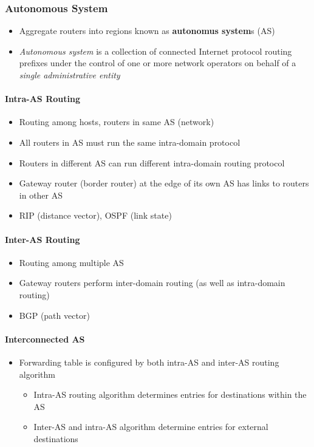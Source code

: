 \subsubsection{Autonomous System}
\begin{itemize}
	\item Aggregate routers into regions known as \textbf{autonomus system}s (AS)
	\item \textit{Autonomous system} is a collection of connected Internet protocol routing prefixes under the control of one or more network operators on behalf of a \textit{single administrative entity}
\end{itemize}

\paragraph{Intra-AS Routing}
\begin{itemize}
	\item Routing among hosts, routers in same AS (network)
	\item All routers in AS must run the same intra-domain protocol
	\item Routers in different AS can run different intra-domain routing protocol
	\item Gateway router (border router) at the edge of its own AS has links to routers in other AS
	\item RIP (distance vector), OSPF (link state)
\end{itemize}

\paragraph{Inter-AS Routing}
\begin{itemize}
	\item Routing among multiple AS
	\item Gateway routers perform inter-domain routing (as well as intra-domain routing)
	\item BGP (path vector)
\end{itemize}

\paragraph{Interconnected AS}
\begin{itemize}
	\item Forwarding table is configured by both intra-AS and inter-AS routing algorithm
	\begin{itemize}
		\item Intra-AS routing algorithm determines entries for destinations within the AS
		\item Inter-AS and intra-AS algorithm determine entries for external destinations
	\end{itemize}
\end{itemize}

